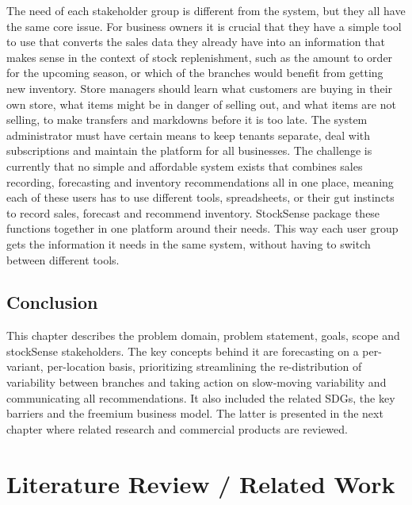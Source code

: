 \documentclass{StockSense}
\begin{document}
The need of each stakeholder group is different from the system, but they all have the same core issue. For business owners it is crucial that they have a simple tool to use that converts the sales data they already have into an information that makes sense in the context of stock replenishment, such as the amount to order for the upcoming season, or which of the branches would benefit from getting new inventory. Store managers should learn what customers are buying in their own store, what items might be in danger of selling out, and what items are not selling, to make transfers and markdowns before it is too late. The system administrator must have certain means to keep tenants separate, deal with subscriptions and maintain the platform for all businesses. The challenge is currently that no simple and affordable system exists that combines sales recording, forecasting and inventory recommendations all in one place, meaning each of these users has to use different tools, spreadsheets, or their gut instincts to record sales, forecast and recommend inventory. StockSense package these functions together in one platform around their needs. This way each user group gets the information it needs in the same system, without having to switch between different tools.

\section{Conclusion}

This chapter describes the problem domain, problem statement, goals, scope and stockSense stakeholders. The key concepts behind it are forecasting on a per-variant, per-location basis, prioritizing streamlining the re-distribution of variability between branches and taking action on slow-moving variability and communicating all recommendations. It also included the related SDGs, the key barriers and the freemium business model. The latter is presented in the next chapter where related research and commercial products are reviewed.


\chapter{Literature Review / Related Work}
\end{document}
